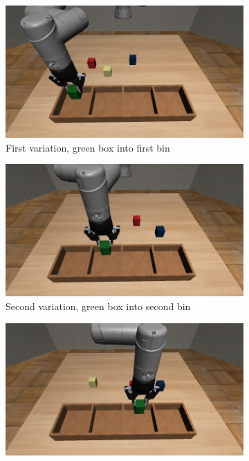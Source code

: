 \begin{figure}[hbt!]
    \centering
    \begin{subfigure}{0.2\textwidth}
        \centering
        \includegraphics[width=\textwidth]{Figures/images/pick_place/task_1.png}
        \caption{First variation, green box into first bin}
        \label{fig:first_variation}
    \end{subfigure}
    \hfill
    \begin{subfigure}{0.2\textwidth}
        \centering
        \includegraphics[width=\textwidth]{Figures/images/pick_place/task_2.png}
        \caption{Second variation, green box into second bin}
        \label{fig:second_variation}
    \end{subfigure}
    \hfill
    \begin{subfigure}{0.2\textwidth}
        \centering
        \includegraphics[width=\textwidth]{Figures/images/pick_place/task_3.png}

\end{subfigure}
\end{figure}
